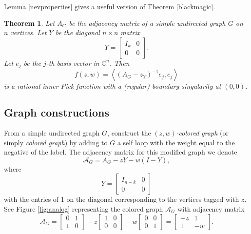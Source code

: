 \documentclass[12pt]{amsart}
\newtheorem{theorem}{Theorem}[section]
\theoremstyle{remark}
\newcommand{\C}{\mathbb{C}}
\newcommand{\ip}[2]{\left\langle #1, #2 \right\rangle}
\newcommand{\inv}{^{-1}}
\newcommand\beq{\begin{equation}}
\newcommand\eeq{\end{equation}}
\newcommand\bbm{\begin{bmatrix}}
\newcommand\ebm{\end{bmatrix}}
\numberwithin{equation}{section}
\newcommand{\dfn}[1]{{\bf #1}\index{#1}}
\newcommand{\cA}{\mathcal{A}}
\begin{document}
Lemma \ref{nevproperties} gives a useful version of Theorem \ref{blackmagic}.

\begin{theorem}\label{blackmagicbetter}
Let $A_G$ be the adjacency matrix of a simple undirected graph $G$ on $n$ vertices. Let $Y$ be the diagonal $n\times n$ matrix 
\beq\label{Ydef2}
Y = \bbm I_{k} & 0 \\ 0 & 0 \ebm.
\eeq
Let $e_j$ be the $j$-th basis vector in $\C^n$. Then
\[
f(z, w) = \ip{(A_G - z_Y)\inv e_j}{e_j}
\]
is a rational inner Pick function with a (regular) boundary singularity at $(0,0)$.
\end{theorem}

\subsection{Graph constructions}

 From a simple undirected graph $G$, construct the \emph{$(z,w)$-colored graph} (or simply \emph{colored graph}) by adding to $G$ a self loop with the weight equal to the negative of the label. The adjacency matrix for this modified graph we denote $$\mathcal{A}_G = A_G - zY - w(I-Y),$$ where $$
Y = \bbm I_{n-k} & 0 \\ 0 & 0 \ebm 
$$  with the entries of 1 on the diagonal corresponding to the vertices tagged with $z$. See Figure \ref{fig:analog} representing the colored graph $\cA_G$ with adjacency matrix 
\[
\cA_G = \bbm 0 & 1 \\ 1 & 0 \ebm - z\bbm 1 & 0 \\ 0 & 0 \ebm - w \bbm 0 & 0 \\ 0 & 1 \ebm = \bbm -z & 1 \\ 1 & -w \ebm.
\]
\end{document}
